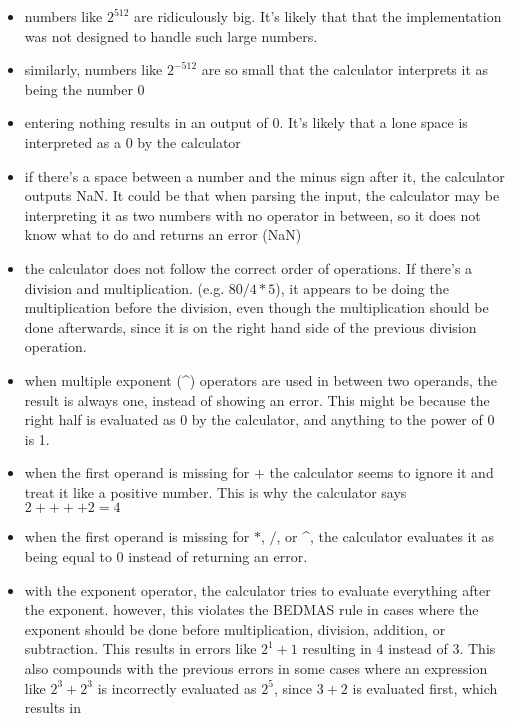 \documentclass[letterpaper]{article}
\begin{document}
\begin{itemize}
    \item numbers like $2^{512}$ are ridiculously big. It's likely that that the implementation was not designed to handle such large numbers.
    \item similarly, numbers like $2^{-512}$ are so small that the calculator interprets it as being the number 0
    \item entering nothing results in an output of 0. It's likely that a lone space is interpreted as a 0 by the calculator
    \item if there's a space between a number and the minus sign after it, the calculator outputs NaN. It could be that when parsing the input, the calculator may be interpreting it as two numbers with no operator in between, so it does not know what to do and returns an error (NaN)
    \item the calculator does not follow the correct order of operations.
          If there's a division and multiplication. (e.g. $80/4*5$),
          it appears to be doing the multiplication before the division,
          even though the multiplication should be done afterwards,
          since it is on the right hand side of the previous division operation.
    \item when multiple exponent (\textasciicircum) operators are used in between two operands,
          the result is always one, instead of showing an error. This might be because the right half is evaluated as 0 by the calculator,
          and anything to the power of 0 is 1.
    \item when the first operand is missing for $+$ the calculator seems to ignore it and treat it like a positive number. This is why the calculator says $2++++2=4$
    \item when the first operand is missing for $*$, $/$, or \textasciicircum, the calculator evaluates it as being equal to 0 instead of returning an error.
    \item with the exponent operator, the calculator tries to evaluate everything after the exponent.
          however, this violates the BEDMAS rule in cases where the exponent should be done before multiplication, division, addition, or subtraction.
          This results in errors like $2^1+1$ resulting in 4 instead of 3.
          This also compounds with the previous errors in some cases where an expression like $2^3 + 2^3$
          is incorrectly evaluated as $2^5$, since $3+2$ is evaluated first, which results in 

\end{itemize}
\end{document}
